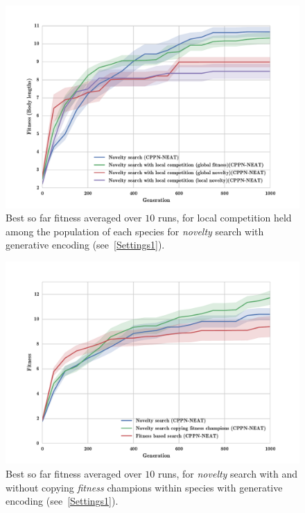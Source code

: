 \begin{figure}[h!]
\centering
\includegraphics[width=1.0\textwidth]{../Figures/Results/NoveltyCompetitionsSize5.pdf}
\caption{Best so far fitness averaged over $10$ runs, for local competition held among the population of each species for \emph{novelty} search with generative encoding (see~\ref{Settings1}).}
\label{fig:NoveltyCompetitionsSize5}
\end{figure}


\begin{figure}[h!]
\centering
\includegraphics[width=1.0\textwidth]{../Figures/Results/CopyFitChampions10.pdf}
\caption{Best so far fitness averaged over $10$ runs, for \emph{novelty} search with and without copying \emph{fitness} champions within species  with generative encoding (see~\ref{Settings1}).}
\label{fig:CopyFitChampions10}
\end{figure}

